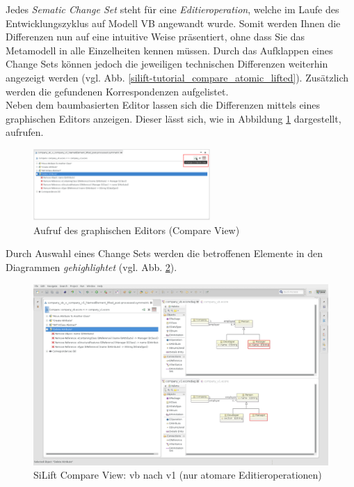 Jedes \textit{Sematic Change Set} steht für eine \textit{Editieroperation}, welche im Laufe des Entwicklungszyklus auf Modell VB angewandt wurde.
Somit werden Ihnen die Differenzen nun auf eine intuitive Weise präsentiert, ohne dass Sie das Metamodell in alle Einzelheiten kennen müssen.
Durch das Aufklappen eines Change Sets können jedoch die jeweiligen technischen Differenzen weiterhin angezeigt werden (vgl. Abb. \ref{silift-tutorial_compare_atomic_lifted}).
Zusätzlich werden die gefundenen Korrespondenzen aufgelistet.\\
Neben dem baumbasierten Editor lassen sich die Differenzen mittels eines graphischen Editors anzeigen.
Dieser lässt sich, wie in Abbildung \ref{silift-tutorial_compare_arrange_compare_view} dargestellt, aufrufen.

\begin{figure}[h!]
\centering
\includegraphics[width=0.6\textwidth]{lifting/graphics/silift-tutorial_compare_arrange_compare_view.png}
\caption{Aufruf des graphischen Editors (Compare View)}
\label{silift-tutorial_compare_arrange_compare_view}
\end{figure}

Durch Auswahl eines Change Sets werden die betroffenen Elemente in den Diagrammen \textit{gehighlightet} (vgl. Abb. \ref{silift-tutorial_compare_compare_view}).

\begin{figure}[h!]
\centering
\includegraphics[width=\textwidth]{lifting/graphics/silift-tutorial_compare_compare_view.png}
\caption{SiLift Compare View: vb nach v1 (nur atomare Editieroperationen)}
\label{silift-tutorial_compare_compare_view}
\end{figure}

